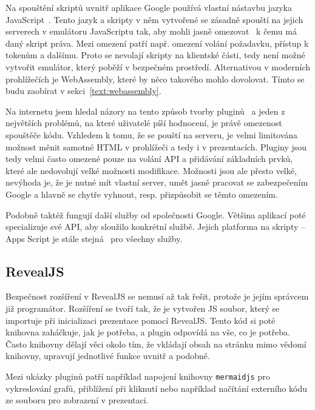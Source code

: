 Na spouštění skriptů uvnitř aplikace Google používá vlastní nástavbu jazyka JavaScript~\cite{google_apps}.
Tento jazyk a skripty v něm vytvořené se zásadně spouští na jejich serverech v emulátoru JavaScriptu tak, aby mohli jasně omezovat~\cite{google_apps} k čemu má daný skript práva. 
Mezi omezení patří např. omezení volání požadavku, přístup k tokenům a dalšímu.
Proto se nevolají skripty na klientské části, tedy není možné vytvořit emulátor, který poběží v bezpečném prostředí.
Alternativou v moderních prohlížečích je WebAssembly, které by něco takového mohlo dovolovat.
Tímto se budu zaobírat v sekci~\ref{text:webassembly}.

Na internetu jsem hledal názory na tento způsob tvorby pluginů~\cite{google_apps_script_redit} a jeden z největších problémů, na které uživatelé píší hodnocení, je právě omezenost spouštěče kódu.
Vzhledem k tomu, že se pouští na serveru, je velmi limitována možnost měnit samotné HTML v prohlížeči a tedy i v prezentacích.
Pluginy jsou tedy velmi často omezené pouze na volání API a přidávání základních prvků, které ale nedovolují velké možnosti modifikace.
Možnosti jsou ale přesto velké, nevýhoda je, že je nutné mít vlastní server, umět jasně pracovat se zabezpečením Google a hlavně se chytře vyhnout, resp. přizpůsobit se těmto omezením.

Podobně taktéž fungují další služby od společnosti Google.
Většina aplikací poté specializuje své API, aby sloužilo konkrétní službě.
Jejich platforma na skripty -- Apps Script je stále stejná~\cite{google_apps_script_redit, google_apps} pro všechny služby.

\subsection{RevealJS}

Bezpečnost rozšíření v RevealJS se nemusí až tak řešit, protože je jejím správcem již programátor.
Rozšíření se tvoří tak, že je vytvořen JS soubor, který se importuje při inicializaci prezentace pomocí RevealJS.
Tento kód si poté knihovna zaháčkuje, jak je potřeba, a plugin odpovídá na vše, co je potřeba.
Často knihovny dělají věci okolo tím, že vkládají obsah na stránku mimo vědomí knihovny, upravují jednotlivé funkce uvnitř a podobně.

Mezi ukázky pluginů patří například napojení knihovny \texttt{mermaidjs} pro vykreslování grafů, přiblížení při kliknutí nebo například načítání externího kódu ze souboru pro zobrazení v prezentaci.

